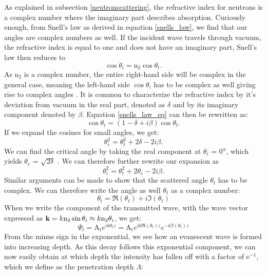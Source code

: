 As explained in subsection \ref{neutronscattering}, the refractive index for neutrons is a complex number where the imaginary part describes absorption. Curiously enough, from Snell's law as derived in equation \ref{snells_law}, we find that our angles are complex numbers as well. If the incident wave travels through vacuum, the refractive index is equal to one and does not have an imaginary part, Snell's law then reduces to
\begin{equation}\label{snells_law_eq}
 \cos\theta_i = \textrm{n}_2 \cos\theta_t.
\end{equation}
As $\textrm{n}_2$ is a complex number, the entire right-hand side will be complex in the general case, meaning the left-hand side $\cos\theta_i$ has to be complex as well giving rise to complex angles \cite{salditt_gisaxs, nielsen_xray}. It is common to characterize the refractive index by it's deviation from vacuum in the real part, denoted as $\delta$ and by its imaginary component denoted by $\beta$. Equation \ref{snells_law_eq} can then be rewritten as:
\begin{equation}
	 \cos\theta_i = (1 - \delta + i\beta) \cos\theta_t.
\end{equation}
If we expand the cosines for small angles, we get:
\begin{equation}\label{theta_expansion}
	\theta_i^2 = \theta_t^2 + 2\delta - 2i\beta.
\end{equation}
We can find the critical angle by taking the real component at $\theta_i$ = 0$\degree$, which yields $\theta_c$ = $\sqrt{2\delta}$ \cite{nielsen_xray}. We can therefore further rewrite our expansion as
\begin{equation}
	\theta_i^2 = \theta_t^2 + 2\theta_c - 2i\beta.
\end{equation}
 Similar arguments can be made to show that the scattered angle $\theta_t$ has to be complex. We can therefore write the angle as well $\theta_t$ as a complex number:
\begin{equation}
\theta_t = \Re(\theta_t) + i\Im(\theta_t)
\end{equation}
When we write the component of the transmitted wave, with the wave vector expressed as $\vb{k} = k \textrm{n}_2\sin\theta_i \approx k \textrm{n}_2 \theta_i$, we get:
\begin{equation}
	\Psi_t = \textrm{A}_\textrm{t}e^{i k\theta_tz} =  \textrm{A}_\textrm{t}e^{i k \Re(\theta_t)z}  e^{- k \Im(\theta_t)z}
\end{equation}
From the minus sign in the exponential, we see how an evanescent wave is formed into increasing depth. As this decay follows this exponential component, we can now easily obtain at which depth the intensity has fallen off with a factor of e$^{-1}$, which we define as the penetration depth $\Lambda$:

